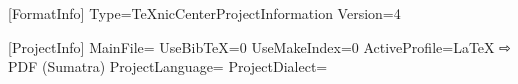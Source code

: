 [FormatInfo]
Type=TeXnicCenterProjectInformation
Version=4

[ProjectInfo]
MainFile=
UseBibTeX=0
UseMakeIndex=0
ActiveProfile=LaTeX ⇨ PDF (Sumatra)
ProjectLanguage=
ProjectDialect=

